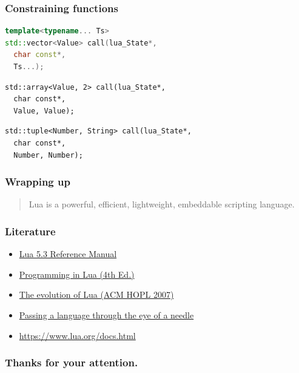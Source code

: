 \documentclass{beamer}
\newif\iftransitions
\begin{document}
\begin{frame}[fragile]
  \frametitle{Constraining functions}

  \begin{lstlisting}[language={C++}]
template<typename... Ts>
std::vector<Value> call(lua_State*,
  char const*,
  Ts...);
  \end{lstlisting}
  \iftransitions \pause \fi
  \begin{lstlisting}
std::array<Value, 2> call(lua_State*,
  char const*,
  Value, Value);
  \end{lstlisting}
  \iftransitions \pause \fi
  \begin{lstlisting}
std::tuple<Number, String> call(lua_State*,
  char const*,
  Number, Number);
  \end{lstlisting}
    
\end{frame}

\begin{frame}
  \frametitle{Wrapping up}

  \begin{quote}Lua is a powerful, efficient, lightweight, embeddable scripting language.\end{quote}
\end{frame}

\begin{frame}
  \frametitle{Literature}

  \begin{itemize}
  \item \href{https://www.lua.org/manual/5.3/}{Lua 5.3 Reference Manual}
  \item \href{https://www.lua.org/pil/}{Programming in Lua (4th Ed.)}
  \item \href{https://www.lua.org/doc/hopl.pdf}{The evolution of Lua (ACM HOPL 2007)}
  \item \href{https://dl.acm.org/citation.cfm?id=1983083}{Passing a language through the eye of a needle}
  \item \href{https://www.lua.org/docs.html}{https://www.lua.org/docs.html}
  \end{itemize}
\end{frame}

\begin{frame}
  \frametitle{Thanks for your attention.}
\end{frame}
\end{document}
